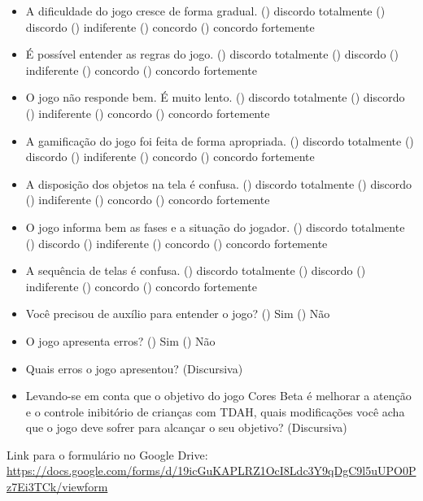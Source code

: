 \begin{itemize}
	\item A dificuldade do jogo cresce de forma gradual.
	\subitem () discordo totalmente
	\subitem () discordo
	\subitem () indiferente
	\subitem () concordo
	\subitem () concordo fortemente
	\item \'E poss\'{i}vel entender as regras do jogo.
	\subitem () discordo totalmente
	\subitem () discordo
	\subitem () indiferente
	\subitem () concordo
	\subitem () concordo fortemente
	\item O jogo n\~{a}o responde bem. \'E muito lento.
	\subitem () discordo totalmente
	\subitem () discordo
	\subitem () indiferente
	\subitem () concordo
	\subitem () concordo fortemente
	\item A gamifica\c{c}\~{a}o do jogo foi feita de forma apropriada.
	\subitem () discordo totalmente
	\subitem () discordo
	\subitem () indiferente
	\subitem () concordo
	\subitem () concordo fortemente
	\item A disposi\c{c}\~{a}o dos objetos na tela \'e confusa.
	\subitem () discordo totalmente
	\subitem () discordo
	\subitem () indiferente
	\subitem () concordo
	\subitem () concordo fortemente
	\item O jogo informa bem as fases e a situa\c{c}\~{a}o do jogador.
	\subitem () discordo totalmente
	\subitem () discordo
	\subitem () indiferente
	\subitem () concordo
	\subitem () concordo fortemente
	\item A sequ\^encia de telas \'e confusa.
	\subitem () discordo totalmente
	\subitem () discordo
	\subitem () indiferente
	\subitem () concordo
	\subitem () concordo fortemente
	\item Voc\^e precisou de aux\'{i}lio para entender o jogo?
	\subitem () Sim
	\subitem () N\~{a}o
	\item O jogo apresenta erros?
	\subitem () Sim
	\subitem () N\~{a}o
	\item Quais erros o jogo apresentou? (Discursiva)
	\item Levando-se em conta que o objetivo do jogo Cores Beta \'e melhorar a aten\c{c}\~{a}o e o controle inibit\'orio de crian\c{c}as com TDAH, quais modifica\c{c}\~oes voc\^e acha que o jogo deve sofrer para alcan\c{c}ar o seu objetivo? (Discursiva)
	
\end{itemize}

Link para o formul\'{a}rio no Google Drive: \url{https://docs.google.com/forms/d/19icGuKAPLRZ1OcI8Ldc3Y9qDgC9l5uUPO0Pz7Ei3TCk/viewform}
